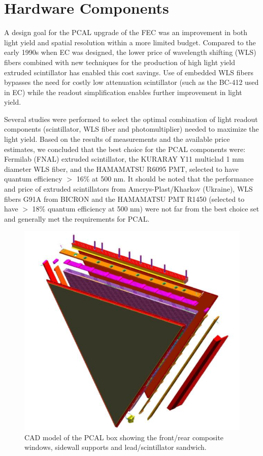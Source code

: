 \section{Hardware Components}

A design goal for the PCAL upgrade of the FEC was an improvement in both light yield and spatial resolution within a more limited budget.  Compared to the early 1990s when EC was designed, the lower price of wavelength shifting (WLS) fibers combined with new techniques for the production of high light yield extruded scintillator has enabled this cost savings.  Use of embedded WLS fibers bypasses the need for costly low attenuation scintillator (such as the BC-412 used in EC) while the readout simplification enables further improvement in light yield.

Several studies were performed \cite{2007002,2007007,2009018} to select the optimal combination of light readout components (scintillator, WLS fiber and photomultiplier) needed to maximize the light yield.  Based on the results of measurements and the available price estimates, we concluded that the best choice for the PCAL components were: Fermilab (FNAL) extruded scintillator, the KURARAY Y11 multiclad 1 mm diameter WLS fiber, and the HAMAMATSU R6095 PMT, selected to have quantum efficiency $>$ 16$\%$ at 500 nm. It should be noted that the performance and price of extruded scintillators from Amcrys-Plast/Kharkov (Ukraine), WLS fibers G91A from BICRON and the HAMAMATSU PMT R1450 (selected to have $>$ 18$\%$ quantum efficiency at 500 nm) were not far from the best choice set and generally met the requirements for PCAL. 

\begin{figure}[hbt]
\centering
\includegraphics[width=0.95\columnwidth,keepaspectratio]{img/S4_0.png}
\caption{CAD model of the PCAL box showing the front/rear composite windows, sidewall supports and lead/scintillator sandwich.}
\label{fig:S4_0}
\end{figure}

